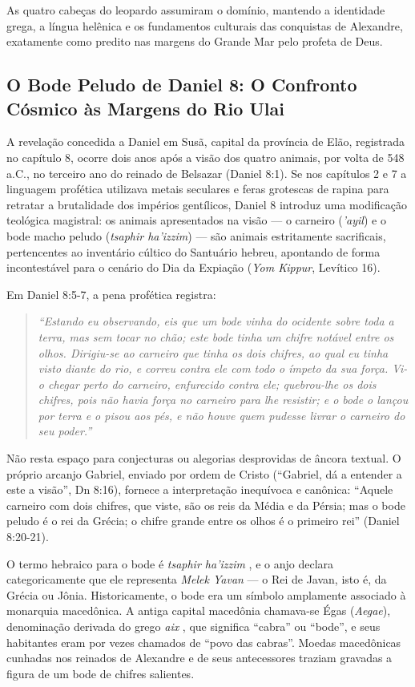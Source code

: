 As quatro cabeças do leopardo assumiram o domínio, mantendo a identidade grega, a língua helênica e os fundamentos culturais das conquistas de Alexandre, exatamente como predito nas margens do Grande Mar pelo profeta de Deus.


\subsection{O Bode Peludo de Daniel 8: O Confronto Cósmico às Margens do Rio Ulai}


A revelação concedida a Daniel em Susã, capital da província de Elão, registrada no capítulo 8, ocorre dois anos após a visão dos quatro animais, por volta de 548 a.C., no terceiro ano do reinado de Belsazar (Daniel 8:1). Se nos capítulos 2 e 7 a linguagem profética utilizava metais seculares e feras grotescas de rapina para retratar a brutalidade dos impérios gentílicos, Daniel 8 introduz uma modificação teológica magistral: os animais apresentados na visão — o carneiro (\textit{'ayil}) e o bode macho peludo (\textit{tsaphir ha'izzim}) — são animais estritamente sacrificais, pertencentes ao inventário cúltico do Santuário hebreu, apontando de forma incontestável para o cenário do Dia da Expiação (\textit{Yom Kippur}, Levítico 16).

Em Daniel 8:5-7, a pena profética registra:

\begin{quote}
\itshape ``Estando eu observando, eis que um bode vinha do ocidente sobre toda a terra, mas sem tocar no chão; este bode tinha um chifre notável entre os olhos. Dirigiu-se ao carneiro que tinha os dois chifres, ao qual eu tinha visto diante do rio, e correu contra ele com todo o ímpeto da sua força. Vi-o chegar perto do carneiro, enfurecido contra ele; quebrou-lhe os dois chifres, pois não havia força no carneiro para lhe resistir; e o bode o lançou por terra e o pisou aos pés, e não houve quem pudesse livrar o carneiro do seu poder.''
\end{quote}


Não resta espaço para conjecturas ou alegorias desprovidas de âncora textual. O próprio arcanjo Gabriel, enviado por ordem de Cristo (``Gabriel, dá a entender a este a visão'', Dn 8:16), fornece a interpretação inequívoca e canônica:
``Aquele carneiro com dois chifres, que viste, são os reis da Média e da Pérsia; mas o bode peludo é o rei da Grécia; o chifre grande entre os olhos é o primeiro rei'' (Daniel 8:20-21).

O termo hebraico para o bode é \textit{tsaphir ha'izzim} , e o anjo declara categoricamente que ele representa \textit{Melek Yavan} — o Rei de Javan, isto é, da Grécia ou Jônia. Historicamente, o bode era um símbolo amplamente associado à monarquia macedônica. A antiga capital macedônia chamava-se Égas (\textit{Aegae}), denominação derivada do grego \textit{aix} , que significa ``cabra'' ou ``bode'', e seus habitantes eram por vezes chamados de ``povo das cabras''. Moedas macedônicas cunhadas nos reinados de Alexandre e de seus antecessores traziam gravadas a figura de um bode de chifres salientes.

